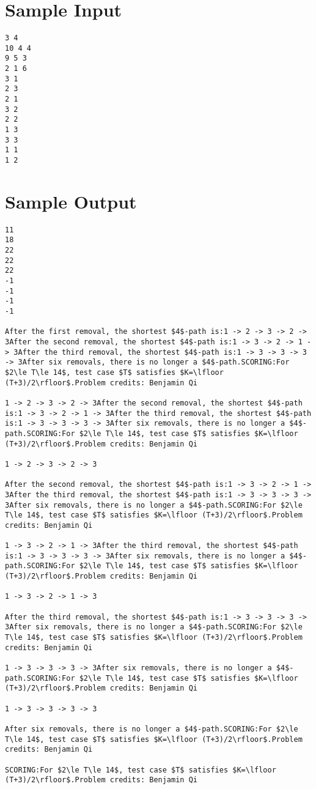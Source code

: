 \documentclass[12pt]{article}
\begin{document}
\section*{Sample Input}
\begin{verbatim}
3 4
10 4 4
9 5 3
2 1 6
3 1
2 3
2 1
3 2
2 2
1 3
3 3
1 1
1 2
\end{verbatim}

\section*{Sample Output}
\begin{verbatim}
11
18
22
22
22
-1
-1
-1
-1

After the first removal, the shortest $4$-path is:1 -> 2 -> 3 -> 2 -> 3After the second removal, the shortest $4$-path is:1 -> 3 -> 2 -> 1 -> 3After the third removal, the shortest $4$-path is:1 -> 3 -> 3 -> 3 -> 3After six removals, there is no longer a $4$-path.SCORING:For $2\le T\le 14$, test case $T$ satisfies $K=\lfloor (T+3)/2\rfloor$.Problem credits: Benjamin Qi

1 -> 2 -> 3 -> 2 -> 3After the second removal, the shortest $4$-path is:1 -> 3 -> 2 -> 1 -> 3After the third removal, the shortest $4$-path is:1 -> 3 -> 3 -> 3 -> 3After six removals, there is no longer a $4$-path.SCORING:For $2\le T\le 14$, test case $T$ satisfies $K=\lfloor (T+3)/2\rfloor$.Problem credits: Benjamin Qi

1 -> 2 -> 3 -> 2 -> 3

After the second removal, the shortest $4$-path is:1 -> 3 -> 2 -> 1 -> 3After the third removal, the shortest $4$-path is:1 -> 3 -> 3 -> 3 -> 3After six removals, there is no longer a $4$-path.SCORING:For $2\le T\le 14$, test case $T$ satisfies $K=\lfloor (T+3)/2\rfloor$.Problem credits: Benjamin Qi

1 -> 3 -> 2 -> 1 -> 3After the third removal, the shortest $4$-path is:1 -> 3 -> 3 -> 3 -> 3After six removals, there is no longer a $4$-path.SCORING:For $2\le T\le 14$, test case $T$ satisfies $K=\lfloor (T+3)/2\rfloor$.Problem credits: Benjamin Qi

1 -> 3 -> 2 -> 1 -> 3

After the third removal, the shortest $4$-path is:1 -> 3 -> 3 -> 3 -> 3After six removals, there is no longer a $4$-path.SCORING:For $2\le T\le 14$, test case $T$ satisfies $K=\lfloor (T+3)/2\rfloor$.Problem credits: Benjamin Qi

1 -> 3 -> 3 -> 3 -> 3After six removals, there is no longer a $4$-path.SCORING:For $2\le T\le 14$, test case $T$ satisfies $K=\lfloor (T+3)/2\rfloor$.Problem credits: Benjamin Qi

1 -> 3 -> 3 -> 3 -> 3

After six removals, there is no longer a $4$-path.SCORING:For $2\le T\le 14$, test case $T$ satisfies $K=\lfloor (T+3)/2\rfloor$.Problem credits: Benjamin Qi

SCORING:For $2\le T\le 14$, test case $T$ satisfies $K=\lfloor (T+3)/2\rfloor$.Problem credits: Benjamin Qi
\end{verbatim}
\end{document}
